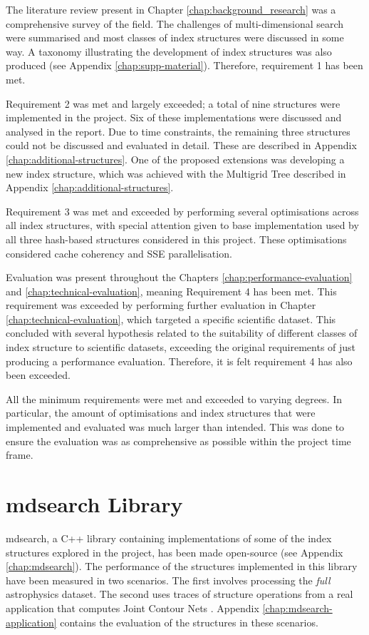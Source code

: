 The literature review present in Chapter \ref{chap:background_research} was a comprehensive survey of the field. The challenges of multi-dimensional search were summarised and most classes of index structures were discussed in some way. A taxonomy illustrating the development of index structures was also produced (see Appendix \ref{chap:supp-material}). Therefore, requirement 1 has been met.

Requirement 2 was met and largely exceeded; a total of nine structures were implemented in the project. Six of these implementations were discussed and analysed in the report. Due to time constraints, the remaining three structures could not be discussed and evaluated in detail. These are described in Appendix \ref{chap:additional-structures}. One of the proposed extensions was developing a new index structure, which was achieved with the Multigrid Tree described in Appendix \ref{chap:additional-structures}.

Requirement 3 was met and exceeded by performing several optimisations across all index structures, with special attention given to base implementation used by all three hash-based structures considered in this project. These optimisations considered cache coherency and SSE parallelisation.

Evaluation was present throughout the Chapters \ref{chap:performance-evaluation} and \ref{chap:technical-evaluation}, meaning Requirement 4 has been met. This requirement was exceeded by performing further evaluation in Chapter \ref{chap:technical-evaluation}, which targeted a specific scientific dataset. This concluded with several hypothesis related to the suitability of different classes of index structure to scientific datasets, exceeding the original requirements of just producing a performance evaluation. Therefore, it is felt requirement 4 has also been exceeded.

All the minimum requirements were met and exceeded to varying degrees. In particular, the amount of optimisations and index structures that were implemented and evaluated was much larger than intended. This was done to ensure the evaluation was as comprehensive as possible within the project time frame.

\section{mdsearch Library}

mdsearch, a C++ library containing implementations of some of the index structures explored in the project, has been made open-source (see Appendix \ref{chap:mdsearch}). The performance of the structures implemented in this library have been measured in two scenarios. The first involves processing the \textit{full} astrophysics dataset. The second uses traces of structure operations from a real application that computes Joint Contour Nets \cite{jcn}. Appendix \ref{chap:mdsearch-application} contains the evaluation of the structures in these scenarios.

